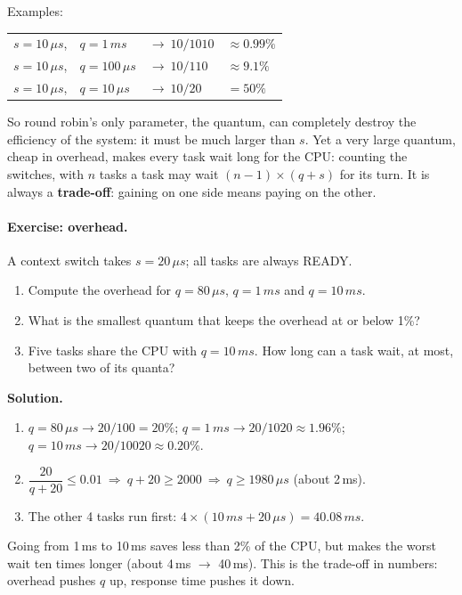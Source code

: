 Examples:
\begin{center}
    \begin{tabular}{l l l l}
        $s = 10\,\mu s$, & $q = 1\,ms$ & $\to\ 10/1010$ & $\approx 0.99\%$ \\
        $s = 10\,\mu s$, & $q = 100\,\mu s$ & $\to\ 10/110$ & $\approx 9.1\%$ \\
        $s = 10\,\mu s$, & $q = 10\,\mu s$ & $\to\ 10/20$ & $= 50\%$ \\
    \end{tabular}
\end{center}

So round robin's only parameter, the quantum, can completely destroy the efficiency of the system: it must be much larger than $s$. Yet a very large quantum, cheap in overhead, makes every task wait long for the CPU: counting the switches, with $n$ tasks a task may wait $(n-1)\times(q+s)$ for its turn. It is always a \textbf{trade-off}: gaining on one side means paying on the other.

\paragraph{Exercise: overhead.} A context switch takes $s = 20\,\mu s$; all tasks are always READY.
\begin{enumerate}
    \item Compute the overhead for $q = 80\,\mu s$, $q = 1\,ms$ and $q = 10\,ms$.
    \item What is the smallest quantum that keeps the overhead at or below 1\%?
    \item Five tasks share the CPU with $q = 10\,ms$. How long can a task wait, at most, between two of its quanta?
\end{enumerate}
\textbf{Solution.}
\begin{enumerate}
    \item $q = 80\,\mu s \to 20/100 = 20\%$; \quad $q = 1\,ms \to 20/1020 \approx 1.96\%$; \quad $q = 10\,ms \to 20/10020 \approx 0.20\%$.
    \item $\dfrac{20}{q + 20} \le 0.01 \ \Rightarrow\ q + 20 \ge 2000 \ \Rightarrow\ q \ge 1980\,\mu s$ (about 2\,ms).
    \item The other 4 tasks run first: $4 \times (10\,ms + 20\,\mu s) = 40.08\,ms$.
\end{enumerate}
Going from 1\,ms to 10\,ms saves less than 2\% of the CPU, but makes the worst wait ten times longer (about 4\,ms $\to$ 40\,ms). This is the trade-off in numbers: overhead pushes $q$ up, response time pushes it down.

